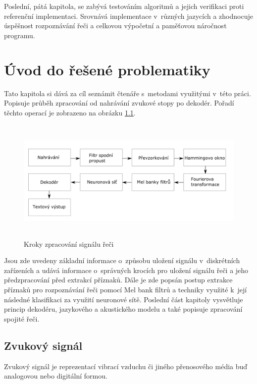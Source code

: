 Poslední, pátá kapitola, se zabývá testováním algoritmů a jejich verifikaci proti referenční implementaci. Srovnává implementace v~různých jazycích a zhodnocuje úspěšnost rozpoznávání řeči a celkovou výpočetní a paměťovou náročnost programu.

\chapter{Úvod do řešené problematiky}
Tato kapitola si dává za cíl seznámit čtenáře s~metodami využitými v~této práci. Popisuje průběh zpracování od nahrávání zvukové stopy po dekodér. Pořadí těchto operací je zobrazeno na obrázku \ref{fig:data_flow}.
\begin{figure}[H]
	\centering
		\includegraphics[height=6cm]{obrazky-figures/data_flow.pdf}
        \caption{Kroky zpracování signálu řeči}
        \label{fig:data_flow}
\end{figure}
Jsou zde uvedeny základní informace o~způsobu uložení signálu v~diskrétních zařízeních a udává informace o~správných krocích pro uložení signálu řeči a jeho předzpracování před extrakcí příznaků. Dále je zde popsán postup extrakce příznaků pro rozpoznávání řeči pomocí Mel bank filtrů a techniky využité k~její následné klasifikaci za využití neuronové sítě. Poslední část kapitoly vysvětluje princip dekodéru, jazykového a akustického modelu a také popisuje zpracování spojité řeči.

\newpage
\section{Zvukový signál}
Zvukový signál je reprezentací vibrací vzduchu či jiného přenosového média buď analogovou nebo digitální formou. 
